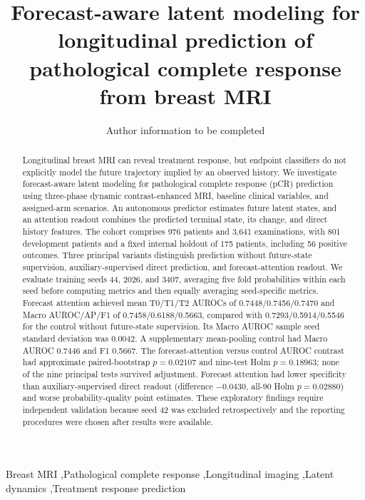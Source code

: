 \documentclass[5p,twocolumn,authoryear]{elsarticle}
\begin{document}
\begin{frontmatter}
\title{Forecast-aware latent modeling for longitudinal prediction of pathological complete response from breast MRI}
\author{Author information to be completed}
\address{Affiliations and corresponding author to be completed}
\begin{abstract}
Longitudinal breast MRI can reveal treatment response, but endpoint classifiers do not explicitly model the future trajectory implied by an observed history. We investigate forecast-aware latent modeling for pathological complete response (pCR) prediction using three-phase dynamic contrast-enhanced MRI, baseline clinical variables, and assigned-arm scenarios. An autonomous predictor estimates future latent states, and an attention readout combines the predicted terminal state, its change, and direct history features. The cohort comprises 976 patients and 3,641 examinations, with 801 development patients and a fixed internal holdout of 175 patients, including 56 positive outcomes. Three principal variants distinguish prediction without future-state supervision, auxiliary-supervised direct prediction, and forecast-attention readout. We evaluate training seeds 44, 2026, and 3407, averaging five fold probabilities within each seed before computing metrics and then equally averaging seed-specific metrics. Forecast attention achieved mean T0/T1/T2 AUROCs of 0.7448/0.7456/0.7470 and Macro AUROC/AP/F1 of 0.7458/0.6188/0.5663, compared with 0.7293/0.5914/0.5546 for the control without future-state supervision. Its Macro AUROC sample seed standard deviation was 0.0042. A supplementary mean-pooling control had Macro AUROC 0.7446 and F1 0.5667. The forecast-attention versus control AUROC contrast had approximate paired-bootstrap $p=0.02107$ and nine-test Holm $p=0.18963$; none of the nine principal tests survived adjustment. Forecast attention had lower specificity than auxiliary-supervised direct readout (difference $-0.0430$, all-90 Holm $p=0.02880$) and worse probability-quality point estimates. These exploratory findings require independent validation because seed 42 was excluded retrospectively and the reporting procedures were chosen after results were available.
\end{abstract}
\begin{keyword}
Breast MRI \sep Pathological complete response \sep Longitudinal imaging \sep Latent dynamics \sep Treatment response prediction
\end{keyword}
\end{frontmatter}








\end{document}
